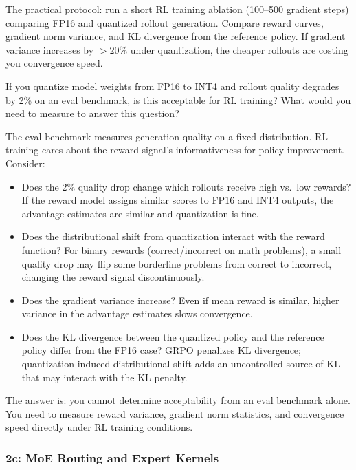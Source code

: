 The practical protocol: run a short RL training ablation (100--500 gradient steps) comparing FP16 and quantized rollout generation. Compare reward curves, gradient norm variance, and KL divergence from the reference policy. If gradient variance increases by $>20\%$ under quantization, the cheaper rollouts are costing you convergence speed.

\begin{thinkfirst}
If you quantize model weights from FP16 to INT4 and rollout quality degrades by 2\% on an eval benchmark, is this acceptable for RL training? What would you need to measure to answer this question?

The eval benchmark measures generation quality on a fixed distribution. RL training cares about the reward signal's informativeness for policy improvement. Consider:
\begin{itemize}
  \item Does the 2\% quality drop change which rollouts receive high vs.\ low rewards? If the reward model assigns similar scores to FP16 and INT4 outputs, the advantage estimates are similar and quantization is fine.
  \item Does the distributional shift from quantization interact with the reward function? For binary rewards (correct/incorrect on math problems), a small quality drop may flip some borderline problems from correct to incorrect, changing the reward signal discontinuously.
  \item Does the gradient variance increase? Even if mean reward is similar, higher variance in the advantage estimates slows convergence.
  \item Does the KL divergence between the quantized policy and the reference policy differ from the FP16 case? GRPO penalizes KL divergence; quantization-induced distributional shift adds an uncontrolled source of KL that may interact with the KL penalty.
\end{itemize}

The answer is: you cannot determine acceptability from an eval benchmark alone. You need to measure reward variance, gradient norm statistics, and convergence speed directly under RL training conditions.
\end{thinkfirst}

\subsubsection*{2c: MoE Routing and Expert Kernels}

